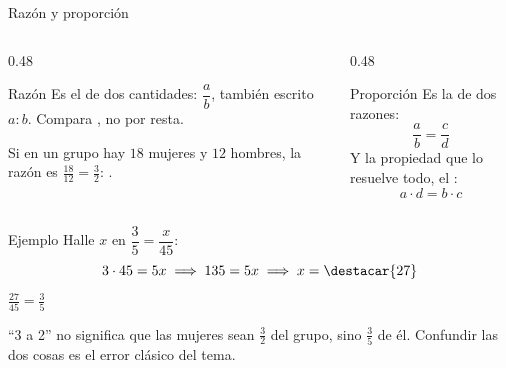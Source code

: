 \documentclass[aspectratio=169,10pt]{beamer}
\begin{document}
\begin{frame}{Razón y proporción}
  \scriptsize
  \begin{columns}[T,onlytextwidth]
    \begin{column}{0.48\textwidth}
      \begin{block}{Razón}
        \tiny
        Es el  de dos cantidades: $\dfrac{a}{b}$, también
        escrito $a:b$. Compara , no por resta.

        \vspace{0.05cm}
        Si en un grupo hay $18$ mujeres y $12$ hombres, la razón es
        $\tfrac{18}{12} = \tfrac{3}{2}$: .
      \end{block}
    \end{column}
    \begin{column}{0.48\textwidth}
      \begin{block}{Proporción}
        \tiny
        Es la  de dos razones:
        \[ \frac{a}{b} = \frac{c}{d} \]
        Y la propiedad que lo resuelve todo, el
        :
        \[ a\cdot d = b\cdot c \]
      \end{block}
    \end{column}
  \end{columns}

  \vspace{0.12cm}
  \begin{exampleblock}{Ejemplo}
    \tiny
    Halle $x$ en $\dfrac{3}{5} = \dfrac{x}{45}$:
    \[ 3\cdot 45 = 5x \;\Longrightarrow\; 135 = 5x
       \;\Longrightarrow\; x = \destacar{27} \]
     $\tfrac{27}{45} = \tfrac{3}{5}$ \checkmark
  \end{exampleblock}

  \vspace{0.06cm}
  {\tiny\color{uniGris} 
  ``3 a 2'' no significa que las mujeres sean $\tfrac{3}{2}$ del grupo, sino
  $\tfrac{3}{5}$ de él. Confundir las dos cosas es el error clásico del tema.}
\end{frame}
\end{document}

